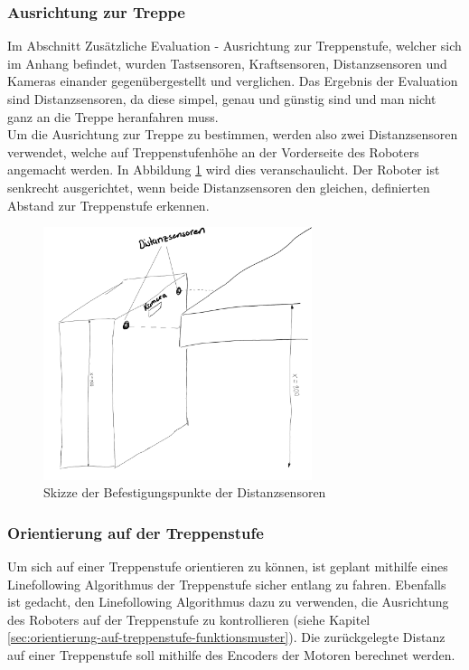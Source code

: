 \subsubsection{Ausrichtung zur Treppe}
\label{sec:ausrichtung-zur-treppe}
Im Abschnitt Zusätzliche Evaluation - Ausrichtung zur Treppenstufe, welcher sich im Anhang befindet, wurden Tastsensoren, Kraftsensoren, Distanzsensoren und Kameras einander gegenübergestellt und verglichen. Das Ergebnis der Evaluation sind Distanzsensoren, da diese simpel, genau und günstig sind und man nicht ganz an die Treppe heranfahren muss.\\
Um die Ausrichtung zur Treppe zu bestimmen, werden also zwei Distanzsensoren verwendet, welche auf Treppenstufenhöhe an der Vorderseite des Roboters angemacht werden. In Abbildung \ref{fig:distanzsensoren} wird dies veranschaulicht. Der Roboter ist senkrecht ausgerichtet, wenn beide Distanzsensoren den gleichen, definierten Abstand zur Treppenstufe erkennen.

\begin{figure}[h]
  \includegraphics[width=0.7\textwidth]{img/orientierung-treppenstufe/Distanzsensoren.png}
  \centering
  \caption{Skizze der Befestigungspunkte der Distanzsensoren}
  \label{fig:distanzsensoren}
\end{figure}

\subsubsection{Orientierung auf der Treppenstufe}
\label{sec:orientierung-auf-der-treppenstufe}
Um sich auf einer Treppenstufe orientieren zu können, ist geplant mithilfe eines Linefollowing Algorithmus der Treppenstufe sicher entlang zu fahren. Ebenfalls ist gedacht, den Linefollowing Algorithmus dazu zu verwenden, die Ausrichtung des Roboters auf der Treppenstufe zu kontrollieren (siehe Kapitel \ref{sec:orientierung-auf-treppenstufe-funktionsmuster}).
Die zurückgelegte Distanz auf einer Treppenstufe soll mithilfe des Encoders der Motoren berechnet werden.

